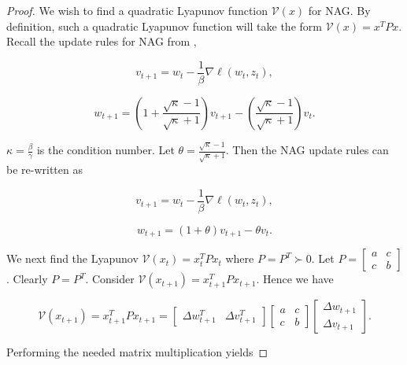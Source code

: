 \documentclass[twoside,11pt]{article}
\begin{document}
\begin{proof}
We wish to find a quadratic Lyapunov function $\mathcal{V}(x)$ for NAG. By definition, such a quadratic Lyapunov function will take the form $\mathcal{V}(x) = x^T Px$. Recall the update rules for NAG from \cite{Bub15},

\begin{equation}
v_{t+1} = w_t - \frac{1}{\beta} \nabla \ell (w_t, z_t),
\end{equation}

\begin{equation}
w_{t+1} = (1 + \frac{\sqrt{\kappa}-1}{\sqrt{\kappa}+1})v_{t+1} - (\frac{\sqrt{\kappa}-1}{\sqrt{\kappa}+1})v_t.
\end{equation}

\noindent
$\kappa = \frac{\beta}{\gamma}$ is the condition number. Let $\theta = \frac{\sqrt{\kappa}-1}{\sqrt{\kappa}+1}$. Then the NAG update rules can be re-written as

\begin{equation}
v_{t+1} = w_t - \frac{1}{\beta} \nabla \ell (w_t, z_t),
\end{equation}

\begin{equation}
w_{t+1} = (1 + \theta)v_{t+1} - \theta v_t.
\end{equation}

\noindent
We next find the Lyapunov $\mathcal{V}(x_t) = x_{t}^T Px_t$ where $P = P^T \succ0$. Let $P = \begin{bmatrix}
    a & c \\
    c & b
\end{bmatrix}$. Clearly $P = P^T$. Consider $\mathcal{V}(x_{t+1}) = x_{t+1}^T P x_{t+1}$. Hence we have

\begin{equation}
\mathcal{V}(x_{t+1}) = x_{t+1}^T P x_{t+1} = \begin{bmatrix}
    \Delta w_{t+1}^T &  \Delta v_{t+1}^T
\end{bmatrix} \begin{bmatrix}
    a & c \\
    c & b
\end{bmatrix} \begin{bmatrix}
    \Delta w_{t+1} \\
    \Delta v_{t+1}
\end{bmatrix}.
\end{equation}

\noindent
Performing the needed matrix multiplication yields


\end{proof}
\end{document}
